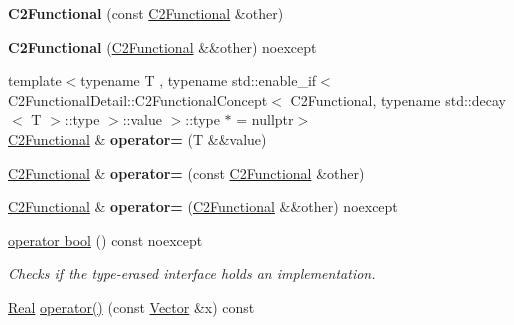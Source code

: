 \begin{DoxyCompactItemize}
\item 
\hypertarget{classSpacy_1_1C2Functional_afe2ea31d1e077b381663fd9533c62f5f}{{\bfseries \-C2\-Functional} (const \hyperlink{classSpacy_1_1C2Functional}{\-C2\-Functional} \&other)}\label{classSpacy_1_1C2Functional_afe2ea31d1e077b381663fd9533c62f5f}

\item 
\hypertarget{classSpacy_1_1C2Functional_ae08eec2c178bd9f9283566f48763d30f}{{\bfseries \-C2\-Functional} (\hyperlink{classSpacy_1_1C2Functional}{\-C2\-Functional} \&\&other) noexcept}\label{classSpacy_1_1C2Functional_ae08eec2c178bd9f9283566f48763d30f}

\item 
\hypertarget{classSpacy_1_1C2Functional_ae5810a028be906128a2c982540fbbcae}{{\footnotesize template$<$typename T , typename std\-::enable\-\_\-if$<$ C2\-Functional\-Detail\-::\-C2\-Functional\-Concept$<$ C2\-Functional, typename std\-::decay$<$ T $>$\-::type $>$\-::value $>$\-::type $\ast$  = nullptr$>$ }\\\hyperlink{classSpacy_1_1C2Functional}{\-C2\-Functional} \& {\bfseries operator=} (\-T \&\&value)}\label{classSpacy_1_1C2Functional_ae5810a028be906128a2c982540fbbcae}

\item 
\hypertarget{classSpacy_1_1C2Functional_af65bf39553c61af917eed58cbe6ca7f3}{\hyperlink{classSpacy_1_1C2Functional}{\-C2\-Functional} \& {\bfseries operator=} (const \hyperlink{classSpacy_1_1C2Functional}{\-C2\-Functional} \&other)}\label{classSpacy_1_1C2Functional_af65bf39553c61af917eed58cbe6ca7f3}

\item 
\hypertarget{classSpacy_1_1C2Functional_a19e885aded28dcc2c2e146031b08c4c6}{\hyperlink{classSpacy_1_1C2Functional}{\-C2\-Functional} \& {\bfseries operator=} (\hyperlink{classSpacy_1_1C2Functional}{\-C2\-Functional} \&\&other) noexcept}\label{classSpacy_1_1C2Functional_a19e885aded28dcc2c2e146031b08c4c6}

\item 
\hyperlink{classSpacy_1_1C2Functional_a7305181d522d504c75c0647737fe7d15}{operator bool} () const noexcept
\begin{DoxyCompactList}\small\item\em \-Checks if the type-\/erased interface holds an implementation. \end{DoxyCompactList}\item 
\hypertarget{classSpacy_1_1C2Functional_a5dad5f40836b6f43662db0a01fd32347}{\hyperlink{classSpacy_1_1Real}{\-Real} \hyperlink{classSpacy_1_1C2Functional_a5dad5f40836b6f43662db0a01fd32347}{operator()} (const \hyperlink{classSpacy_1_1Vector}{\-Vector} \&x) const }\label{classSpacy_1_1C2Functional_a5dad5f40836b6f43662db0a01fd32347}


\end{DoxyCompactItemize}
